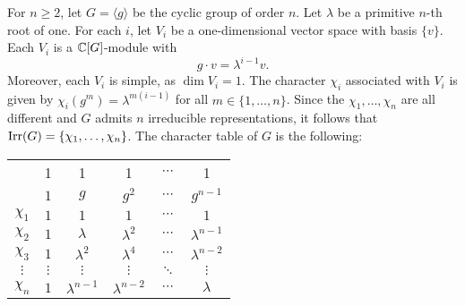 \begin{example}
    For $n\geq2$, let  
	$G=\langle g\rangle$ be the cyclic group of order $n$. Let $\lambda$ be a primitive $n$-th root of one. For each $i$, 
    let $V_i$ be a one-dimensional vector space with basis 
	$\{v\}$. Each $V_i$ is a $\mathbb{C}[G]$-module with 
    \[
		g\cdot v=\lambda^{i-1}v.
	\]
	Moreover, each $V_i$ is simple, as $\dim V_i=1$. The character $\chi_i$ associated with 
	$V_i$ is given by $\chi_i(g^m)=\lambda^{m(i-1)}$ for all 
	$m\in\{1,\dots,n\}$. Since the $\chi_1,\dots,\chi_n$ are all different and $G$ admits $n$ irreducible representations,
    it follows that $\operatorname{Irr}(G)=\{\chi_1,\dots,\chi_n\}$. The character
    table of $G$ is the following: 
	\begin{center}
		\begin{tabular}{|c|ccccc|}
			\hline 
			& 1 & 1 & 1 & $\cdots$ & 1\tabularnewline
			& $1$ & $g$ & $g^2$ & $\cdots$ & $g^{n-1}$\tabularnewline
			\hline 
			$\chi_{1}$ & $1$ & $1$ & $1$ & $\cdots$ & $1$\tabularnewline
			$\chi_{2}$ & $1$ & $\lambda$ & $\lambda^2$ & $\cdots$ & $\lambda^{n-1}$\tabularnewline
			$\chi_{3}$ & $1$ & $\lambda^2$ & $\lambda^4$ & $\cdots$ & $\lambda^{n-2}$\tabularnewline
			$\vdots$ & $\vdots$ & $\vdots$ & $\vdots$ & $\ddots$ & $\vdots$\tabularnewline
			$\chi_{n}$ & $1$ & $\lambda^{n-1}$ & $\lambda^{n-2}$ & $\cdots$ & $\lambda$\tabularnewline
			\hline
		\end{tabular}
	\end{center}
\end{example}

